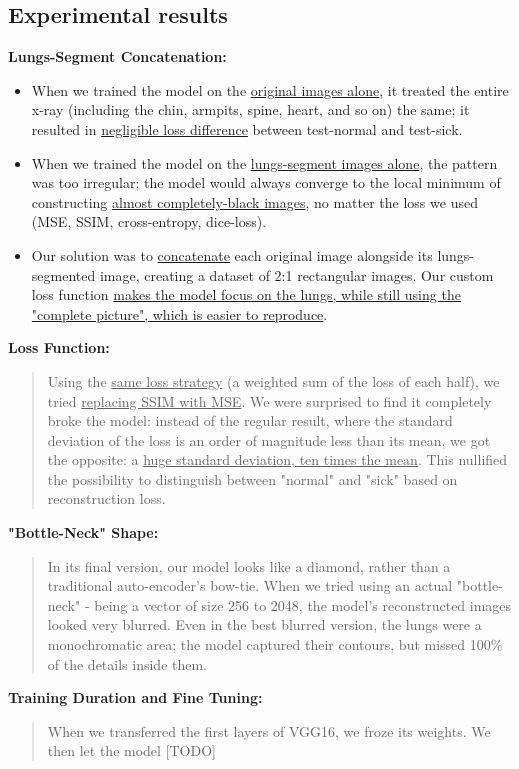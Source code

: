 \documentclass{article}
\begin{document}
\newpage
\subsection{Experimental results}

\textbf{Lungs-Segment Concatenation:} 
\begin{itemize}
\item When we trained the model on the \uline{original images alone}, it treated the entire x-ray (including the chin, armpits, spine, heart, and so on) the same; it resulted in \uline{negligible loss difference} between test-normal and test-sick.
\item When we trained the model on the \uline{lungs-segment images alone}, the pattern was too irregular; the model would always converge to the local minimum of constructing \uline{almost completely-black images}, no matter the loss we used (MSE, SSIM, cross-entropy, dice-loss).
\item Our solution was to \uline{concatenate} each original image alongside its lungs-segmented image, creating a dataset of 2:1 rectangular images. Our custom loss function \uline{makes the model focus on the lungs, while still using the "complete picture", which is easier to reproduce}.
\end{itemize}

\textbf{Loss Function:} 
\begin{quote}
Using the \uline{same loss strategy} (a weighted sum of the loss of each half), we tried \uline{replacing SSIM with MSE}. We were surprised to find it completely broke the model: instead of the regular result, where the standard deviation of the loss is an order of magnitude less than its mean, we got the opposite: a \uline{huge standard deviation, ten times the mean}. This nullified the possibility to distinguish between "normal" and "sick" based on reconstruction loss.
\end{quote}

\textbf{"Bottle-Neck" Shape:} 
\begin{quote}
In its final version, our model looks like a diamond, rather than a traditional auto-encoder's bow-tie. When we tried using an actual "bottle-neck" - being a vector of size 256 to 2048, the model's reconstructed images looked very blurred. Even in the best blurred version, the lungs were a monochromatic area; the model captured their contours, but missed 100\% of the details inside them.
\end{quote}

\textbf{Training Duration and Fine Tuning:}
\begin{quote}
When we transferred the first layers of VGG16, we froze its weights. We then let the model [TODO]
\end{quote}
\end{document}
